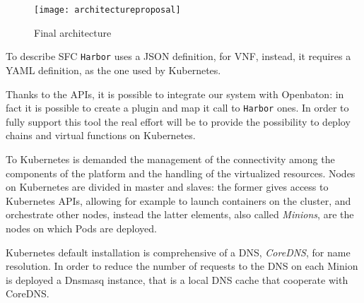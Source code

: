 \begin{figure}[H]
  \centering
  \texttt{[image: architectureproposal]}
  \caption{Final architecture}
  \label{chap:archimple:sec:secondattempt:img:attempt2v1harbor}
\end{figure}

To describe SFC \texttt{Harbor} uses a JSON definition, for VNF, instead, it
requires a YAML definition, as the one used by Kubernetes. 

Thanks to the APIs, it is possible to integrate our system with Openbaton: in
fact it is possible to create a plugin and map it call to \texttt{Harbor} ones.
In order to fully support this tool the real effort will be to provide the
possibility to deploy chains and virtual functions on Kubernetes. 

To Kubernetes is demanded the management of the connectivity among the
components of the platform and the handling of the virtualized resources.
Nodes on Kubernetes are divided in master and slaves: the former gives access to
Kubernetes APIs, allowing for example to launch containers on the cluster, and
orchestrate other nodes, instead the latter elements, also called
\emph{Minions}, are the nodes on which Pods are deployed.

Kubernetes default installation is comprehensive of a DNS, \emph{CoreDNS}, for
name resolution. In order to reduce the number of requests to the DNS on each
Minion is deployed a Dnsmasq instance, that is a local DNS cache that cooperate
with CoreDNS.